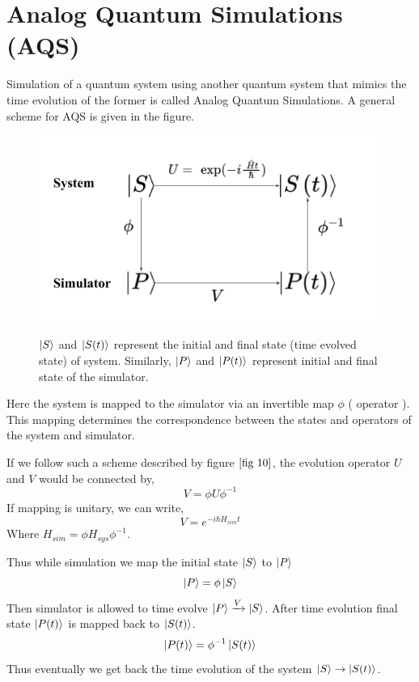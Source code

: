 \documentclass[12pt,a4paper]{report}
\begin{document}
\section{Analog Quantum Simulations (AQS)}
Simulation of a quantum system using another quantum system that mimics the time evolution of the former is called Analog Quantum Simulations. A general scheme for AQS is given in the figure.
\begin{figure}[h]
\graphicspath{ {./Images/} }	
{\includegraphics[width=\textwidth]{fig_10.png}}
\centering
\caption{$\ket{S}$ and $\ket{S(t)}$ represent the initial and final state (time evolved state) of system. Similarly, $\ket{P}$ and $\ket{P(t)}$ represent initial and final state of the simulator. }
\label{fig 10}
\end{figure}
Here the system is mapped to the simulator via an invertible map $\phi$ ( operator ). This mapping determines the correspondence between the states and operators of the system and simulator.\par
If we follow such a scheme described by figure $\ref*{fig 10}$, the evolution operator $U$ and $ V$ would be connected by,
\begin{equation}
V = \phi U \phi^{-1}
\end{equation}
If mapping is unitary, we can write,
\begin{equation}
V = e^{- i \hbar H_{sim} t}
\end{equation}
Where $H_{sim} = \phi H_{sys} \phi^{-1}$.\par
Thus while simulation we map the initial state $\ket{S}$ to $\ket{P}$
\begin{equation}
\ket{P} = \phi \ket{S} 
\end{equation}
Then simulator is allowed to time evolve $\ket{P} \xrightarrow{V} \ket{S}$. After time evolution final state $\ket{P(t)}$ is mapped back to $\ket{S(t)}$.
\begin{equation}
\ket{P(t)} = \phi^{-1}\ket{S(t)}
\end{equation}
Thus eventually we get back the time evolution of the system $\ket{S} \rightarrow \ket{S(t)}$.
\end{document}
